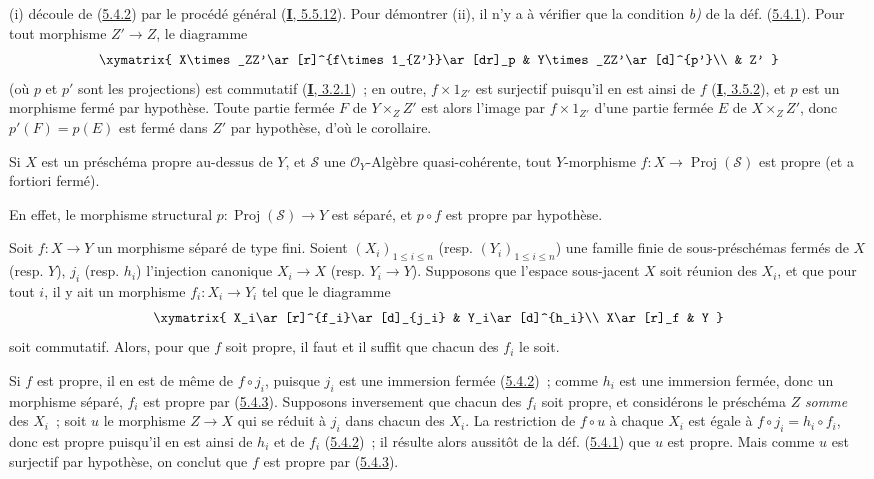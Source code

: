 (i) découle de (\hyperref[II.5.4.2-fr]{5.4.2}) par le procédé général
(\hyperref[I.5.5.12-fr]{\textbf{I}, 5.5.12}). Pour démontrer (ii), il n'y a à
vérifier que la condition \emph{b)} de la déf. (\hyperref[II.5.4.1-fr]{5.4.1}).
Pour tout morphisme $Z'\to Z$, le diagramme
\[
  \xymatrix{
    X\times_ZZ'\ar[r]^{f\times1_{Z'}}\ar[dr]_p &
    Y\times_ZZ'\ar[d]^{p'}\\
    & Z'
  }
\]
(où $p$ et $p'$ sont les projections) est commutatif
(\hyperref[I.3.2.1-fr]{\textbf{I}, 3.2.1})~; en outre, $f\times1_{Z'}$ est surjectif
puisqu'il en est ainsi de $f$ (\hyperref[I.3.5.2-fr]{\textbf{I}, 3.5.2}), et $p$ est
un morphisme fermé par hypothèse. Toute partie fermée $F$ de
$Y\times_ZZ'$ est alors l'image par $f\times1_{Z'}$ d'une partie fermée $E$
de $X\times_ZZ'$, donc $p'(F)=p(E)$ est fermé dans $Z'$ par hypothèse, d'où
le corollaire.

\begin{corollary}[5.4.4]
\label{II.5.4.4-fr}
Si $X$ est un préschéma propre au-dessus de $Y$, et $\mathcal{S}$ une
$\mathcal{O}_Y$-Algèbre quasi-cohérente, tout $Y$-morphisme
$f:X\to\operatorname{Proj}(\mathcal{S})$ est propre (et \textup{a fortiori} fermé).
\end{corollary}

En effet, le morphisme structural
$p:\operatorname{Proj}(\mathcal{S})\to Y$ est séparé, et $p\circ f$ est
propre par hypothèse.

\begin{corollary}[5.4.5]
\label{II.5.4.5-fr}
Soit $f:X\to Y$ un morphisme séparé de type fini. Soient
$(X_i)_{1\leq i\leq n}$ \textup{(resp. $(Y_i)_{1\leq i\leq n}$)} une famille finie
de sous-préschémas fermés de $X$ \textup{(resp. $Y$)}, $j_i$ \textup{(resp. $h_i$)}
l'injection canonique $X_i\to X$ \textup{(resp. $Y_i\to Y$)}. Supposons que l'espace
sous-jacent $X$ soit réunion des $X_i$, et que pour tout $i$, il y ait un
morphisme $f_i:X_i\to Y_i$ tel que le diagramme
\[
  \xymatrix{
    X_i\ar[r]^{f_i}\ar[d]_{j_i} & Y_i\ar[d]^{h_i}\\
    X\ar[r]_f & Y
  }
\]
soit commutatif. Alors, pour que $f$ soit propre, il faut et il suffit que
chacun des $f_i$ le soit.
\end{corollary}


Si $f$ est propre, il en est de même de $f\circ j_i$, puisque $j_i$ est une
immersion fermée (\hyperref[II.5.4.2-fr]{5.4.2})~; comme $h_i$ est une
immersion fermée, donc un morphisme séparé, $f_i$ est propre par
(\hyperref[II.5.4.3-fr]{5.4.3}). Supposons inversement que chacun des $f_i$
soit propre, et considérons le préschéma $Z$ \emph{somme} des $X_i$~; soit $u$ le
morphisme $Z\to X$ qui se réduit à $j_i$ dans chacun des $X_i$. La
restriction de $f\circ u$ à chaque $X_i$ est égale à
$f\circ j_i=h_i\circ f_i$, donc est propre puisqu'il en est ainsi de $h_i$
et de $f_i$ (\hyperref[II.5.4.2-fr]{5.4.2})~; il résulte alors aussitôt de
la déf. (\hyperref[II.5.4.1-fr]{5.4.1}) que $u$ est propre. Mais
comme $u$ est surjectif par hypothèse, on conclut que $f$ est propre par
(\hyperref[II.5.4.3-fr]{5.4.3}).

